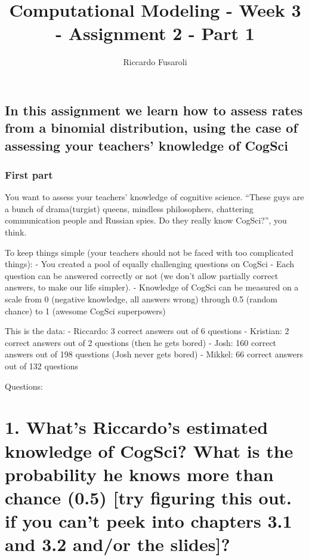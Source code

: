 \documentclass[]{article}
\title{Computational Modeling - Week 3 - Assignment 2 - Part 1}
\author{Riccardo Fusaroli}
\date{}
\begin{document}
\maketitle

\subsection{In this assignment we learn how to assess rates from a
binomial distribution, using the case of assessing your teachers'
knowledge of
CogSci}\label{in-this-assignment-we-learn-how-to-assess-rates-from-a-binomial-distribution-using-the-case-of-assessing-your-teachers-knowledge-of-cogsci}

\subsubsection{First part}\label{first-part}

You want to assess your teachers' knowledge of cognitive science.
``These guys are a bunch of drama(turgist) queens, mindless
philosophers, chattering communication people and Russian spies. Do they
really know CogSci?'', you think.

To keep things simple (your teachers should not be faced with too
complicated things): - You created a pool of equally challenging
questions on CogSci - Each question can be answered correctly or not (we
don't allow partially correct answers, to make our life simpler). -
Knowledge of CogSci can be measured on a scale from 0 (negative
knowledge, all answers wrong) through 0.5 (random chance) to 1 (awesome
CogSci superpowers)

This is the data: - Riccardo: 3 correct answers out of 6 questions -
Kristian: 2 correct answers out of 2 questions (then he gets bored) -
Josh: 160 correct answers out of 198 questions (Josh never gets bored) -
Mikkel: 66 correct answers out of 132 questions

Questions:

\section{1. What's Riccardo's estimated knowledge of CogSci? What is the
probability he knows more than chance (0.5) {[}try figuring this out. if
you can't peek into chapters 3.1 and 3.2 and/or the
slides{]}?}\label{whats-riccardos-estimated-knowledge-of-cogsci-what-is-the-probability-he-knows-more-than-chance-0.5-try-figuring-this-out.-if-you-cant-peek-into-chapters-3.1-and-3.2-andor-the-slides}
\end{document}
